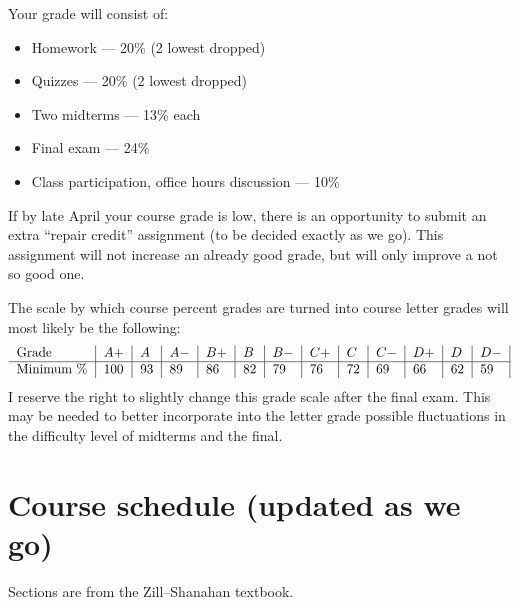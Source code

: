 \documentclass[oneside,11pt]{amsart}
\begin{document}
Your grade will consist of:
\begin{itemize}
	\item Homework --- 20\% (2 lowest dropped)
	\item Quizzes --- 20\% (2 lowest dropped)
	\item Two midterms --- 13\% each
	\item Final exam --- 24\%
	\item Class participation, office hours discussion --- 10\%
\end{itemize}
If by late April your course grade is low, there is an opportunity to submit an extra
``repair credit'' assignment (to be decided exactly as we go). This assignment will not 
increase an already good grade, but will only improve a not so good one.

The scale by which course percent grades are turned into course letter grades
will most likely be the following:
\begin{equation*}
	\begin{tabular}{l|l|l|l|l|l|l|l|l|l|l|l|l|}
		Grade      & $ A+	$ & $A	$ & $A-	$ & $B+	$ & $B	$ & $B-	$ & $C+	$ & $C	$ & $C-	$ & $D+	$ & $D	$ & $D-$ \\
		\hline
		Minimum \% & 100     & 93   & 89    & 86    & 82    & 79    & 76    & 72    & 69    & 66    & 62    & 59
	\end{tabular}
\end{equation*}
I reserve the right to slightly change this grade scale after the
final exam.
This may be needed
to better incorporate into the letter grade
possible fluctuations in the difficulty level of 
midterms and the final.

\section{Course schedule (updated as we go)}
\label{sec:schedule}

Sections are from the Zill--Shanahan textbook.
\end{document}
